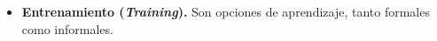 \begin{itemize}
\item \textbf{Entrenamiento (\textit{Training}).} Son opciones de aprendizaje, tanto formales como informales.
\end{itemize}